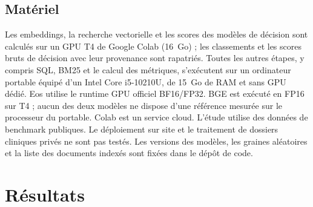 \documentclass{article}
\begin{document}
\subsection{Matériel}

Les embeddings, la recherche vectorielle et les scores des modèles de décision sont calculés sur un GPU T4 de Google Colab (16~Go) ; les classements et les scores bruts de décision avec leur provenance sont rapatriés. Toutes les autres étapes, y compris SQL, BM25 et le calcul des métriques, s'exécutent sur un ordinateur portable équipé d'un Intel Core i5-10210U, de 15~Go de RAM et sans GPU dédié. Eos utilise le runtime GPU officiel BF16/FP32. BGE est exécuté en FP16 sur T4 ; aucun des deux modèles ne dispose d'une référence mesurée sur le processeur du portable. Colab est un service cloud. L'étude utilise des données de benchmark publiques. Le déploiement sur site et le traitement de dossiers cliniques privés ne sont pas testés. Les versions des modèles, les graines aléatoires et la liste des documents indexés sont fixées dans le dépôt de code.

\section{Résultats}
\label{sec:results}
\end{document}
